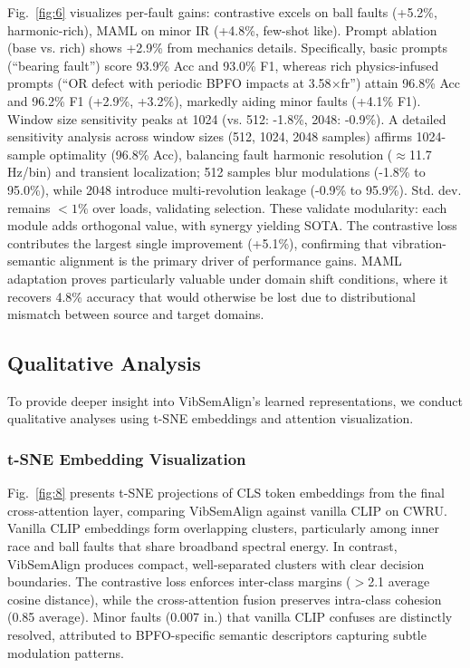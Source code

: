 \begin{table}[htbp]
\begin{table}[htbp]
\begin{table}[htbp]
Fig.~\ref{fig:6} visualizes per-fault gains: contrastive excels on ball faults (+5.2\%, harmonic-rich), MAML on minor IR (+4.8\%, few-shot like). Prompt ablation (base vs. rich) shows +2.9\% from mechanics details. Specifically, basic prompts (``bearing fault'') score 93.9\% Acc and 93.0\% F1, whereas rich physics-infused prompts (``OR defect with periodic BPFO impacts at 3.58$\times$fr'') attain 96.8\% Acc and 96.2\% F1 (+2.9\%, +3.2\%), markedly aiding minor faults (+4.1\% F1). Window size sensitivity peaks at 1024 (vs. 512: -1.8\%, 2048: -0.9\%). A detailed sensitivity analysis across window sizes (512, 1024, 2048 samples) affirms 1024-sample optimality (96.8\% Acc), balancing fault harmonic resolution ($\approx$11.7 Hz/bin) and transient localization; 512 samples blur modulations (-1.8\% to 95.0\%), while 2048 introduce multi-revolution leakage (-0.9\% to 95.9\%). Std. dev. remains $<1\%$ over loads, validating selection. These validate modularity: each module adds orthogonal value, with synergy yielding SOTA. The contrastive loss contributes the largest single improvement (+5.1\%), confirming that vibration-semantic alignment is the primary driver of performance gains. MAML adaptation proves particularly valuable under domain shift conditions, where it recovers 4.8\% accuracy that would otherwise be lost due to distributional mismatch between source and target domains.

\subsection{Qualitative Analysis}

To provide deeper insight into VibSemAlign's learned representations, we conduct qualitative analyses using t-SNE embeddings and attention visualization.

\subsubsection{t-SNE Embedding Visualization}
Fig.~\ref{fig:8} presents t-SNE projections of CLS token embeddings from the final cross-attention layer, comparing VibSemAlign against vanilla CLIP on CWRU. Vanilla CLIP embeddings form overlapping clusters, particularly among inner race and ball faults that share broadband spectral energy. In contrast, VibSemAlign produces compact, well-separated clusters with clear decision boundaries. The contrastive loss enforces inter-class margins ($>$2.1 average cosine distance), while the cross-attention fusion preserves intra-class cohesion (0.85 average). Minor faults (0.007 in.) that vanilla CLIP confuses are distinctly resolved, attributed to BPFO-specific semantic descriptors capturing subtle modulation patterns.


\end{table}
\end{table}
\end{table}
